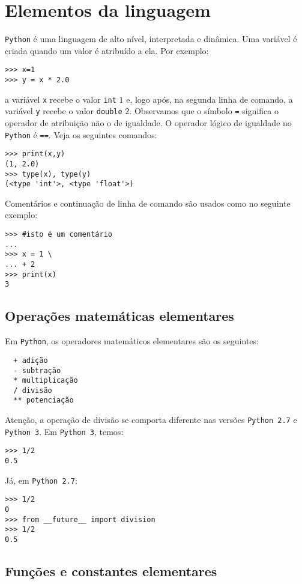 \section{Elementos da linguagem}

\verb+Python+ é uma linguagem de alto nível, interpretada e dinâmica. Uma variável é criada quando um valor é atribuído a ela. Por exemplo:
\begin{verbatim}
>>> x=1
>>> y = x * 2.0
\end{verbatim}
a variável \verb+x+ recebe o valor \verb+int+ $1$ e, logo após, na segunda linha de comando, a variável \verb+y+ recebe o valor \verb+double+ $2$. Observamos que o símbolo \verb+=+ significa o operador de atribuição não o de igualdade. O operador lógico de igualdade no \verb+Python+ é \verb+==+. Veja os seguintes comandos:
\begin{verbatim}
>>> print(x,y)
(1, 2.0)
>>> type(x), type(y)
(<type 'int'>, <type 'float'>)
\end{verbatim}

Comentários e continuação de linha de comando são usados como no seguinte exemplo:
\begin{verbatim}
>>> #isto é um comentário
...
>>> x = 1 \
... + 2
>>> print(x)
3
\end{verbatim}

\subsection{Operações matemáticas elementares}

Em \verb+Python+, os operadores matemáticos elementares são os seguintes:
\begin{verbatim}
  + adição
  - subtração
  * multiplicação
  / divisão
  ** potenciação
\end{verbatim}

Atenção, a operação de divisão se comporta diferente nas versões \verb+Python 2.7+ e \verb+Python 3+. Em \verb+Python 3+, temos:
\begin{verbatim}
>>> 1/2
0.5
\end{verbatim}
Já, em \verb+Python 2.7+:
\begin{verbatim}
>>> 1/2
0
>>> from __future__ import division
>>> 1/2
0.5
\end{verbatim}

\subsection{Funções e constantes elementares}

